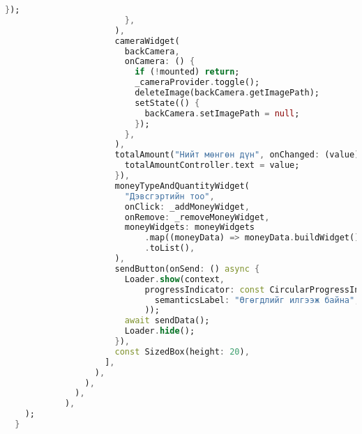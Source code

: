 \begin{lstlisting}[language=Dart, caption=Data Spider нүүр хуудасны хэрэгжүүлэлт, frame=single]
                          });
                        },
                      ),
                      cameraWidget(
                        backCamera,
                        onCamera: () {
                          if (!mounted) return;
                          _cameraProvider.toggle();
                          deleteImage(backCamera.getImagePath);
                          setState(() {
                            backCamera.setImagePath = null;
                          });
                        },
                      ),
                      totalAmount("Нийт мөнгөн дүн", onChanged: (value) {
                        totalAmountController.text = value;
                      }),
                      moneyTypeAndQuantityWidget(
                        "Дэвсгэртийн тоо",
                        onClick: _addMoneyWidget,
                        onRemove: _removeMoneyWidget,
                        moneyWidgets: moneyWidgets
                            .map((moneyData) => moneyData.buildWidget())
                            .toList(),
                      ),
                      sendButton(onSend: () async {
                        Loader.show(context,
                            progressIndicator: const CircularProgressIndicator(
                              semanticsLabel: "Өгөгдлийг илгээж байна",
                            ));
                        await sendData();
                        Loader.hide();
                      }),
                      const SizedBox(height: 20),
                    ],
                  ),
                ),
              ),
            ),
    );
  }


\end{lstlisting}
